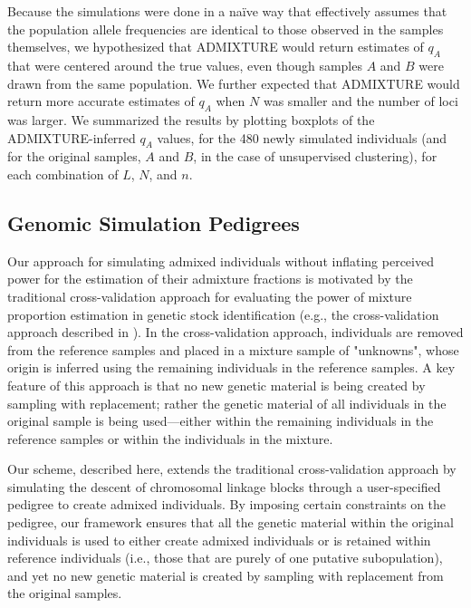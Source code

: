 Because the simulations were done in a na\"{i}ve way that effectively assumes that the population
allele frequencies are identical to those observed in the samples themselves, we hypothesized that ADMIXTURE would return estimates of
$q_A$ that were
centered around the true values, even though samples $A$ and $B$ were drawn from the same
population.
We further expected that ADMIXTURE would return more accurate estimates of
$q_A$ when $N$ was smaller and the number of loci was larger.
We summarized the results by plotting boxplots of the ADMIXTURE-inferred $q_A$ values,
 for the 480 newly simulated individuals (and for the original samples, $A$ and $B$, in the
 case of unsupervised clustering),
for each combination of $L$, $N$, and $n$.




\subsection*{Genomic Simulation Pedigrees}

Our approach for simulating admixed individuals without inflating perceived power for
the estimation of their admixture fractions is motivated by the traditional cross-validation
approach for evaluating the power of mixture proportion
estimation in genetic stock identification (e.g., the cross-validation approach
described in \citealt{moran2019bayesian}).
In the cross-validation approach, individuals are removed from the reference
samples and placed in a mixture sample of "unknowns", whose origin
is inferred using the remaining individuals in the reference samples.  A key
feature of this approach is that no new genetic material is being created by
sampling with replacement; rather the genetic material of all individuals
in the original sample is being used---either within the remaining individuals in the
reference samples or within the individuals in the mixture.

Our scheme, described here, extends the traditional cross-validation approach
by simulating the descent of chromosomal linkage blocks through a user-specified
pedigree to create admixed individuals.  By imposing certain constraints
on the pedigree, our framework ensures that all the genetic material
within the original individuals is used to either create admixed individuals or is retained 
within reference individuals (i.e., those that are purely of one
putative subopulation), and yet no new genetic material is
created by sampling with replacement from the original samples.

